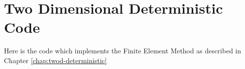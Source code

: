 \chapter{Two Dimensional Deterministic Code}

Here is the code which implements the Finite Element Method as described in
Chapter \ref{chap:twod-deterministic}




